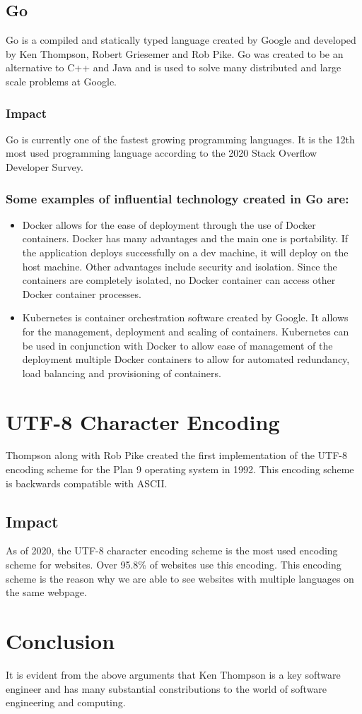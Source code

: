 \documentclass{article}
\begin{document}
\subsection{Go}
Go is a compiled and statically typed language created by Google and developed
by Ken Thompson, Robert Griesemer and Rob Pike. Go was created to be an
alternative to C++ and Java and is used to solve many distributed and large
scale problems at Google.

\subsubsection{Impact}
Go is currently one of the fastest growing programming languages. It is the
12th most used programming language according to the 2020 Stack Overflow
Developer Survey.\cite{dev2020survey}

\subsubsection*{Some examples of influential technology created in Go are:}
\begin{itemize}
  \item Docker allows for the ease of deployment through the use of Docker
    containers. Docker has many advantages and the main one is portability. If
    the application deploys successfully on a dev machine, it will deploy on
    the host machine. Other advantages include security and isolation. Since
    the containers are completely isolated, no Docker container can access
    other Docker container processes.
  \item Kubernetes is container orchestration software created by Google. It
    allows for the management, deployment and scaling of containers. Kubernetes
    can be used in conjunction with Docker to allow ease of management of the
    deployment multiple Docker containers to allow for automated redundancy,
    load balancing and provisioning of containers.
\end{itemize}

\section{UTF-8 Character Encoding}
Thompson along with Rob Pike created the first implementation of the UTF-8
encoding scheme for the Plan 9 operating system in 1992.\cite{pikehello} This
encoding scheme is backwards compatible with ASCII.

\subsection{Impact}
As of 2020, the UTF-8 character encoding scheme is the most used encoding
scheme for websites. Over 95.8\% of websites use this
encoding.\cite{web2020tech} This encoding scheme is the reason why we are able
to see websites with multiple languages on the same webpage.

\section{Conclusion}
It is evident from the above arguments that Ken Thompson is a key software
engineer and has many substantial constributions to the world of software
engineering and computing.



\end{document}
